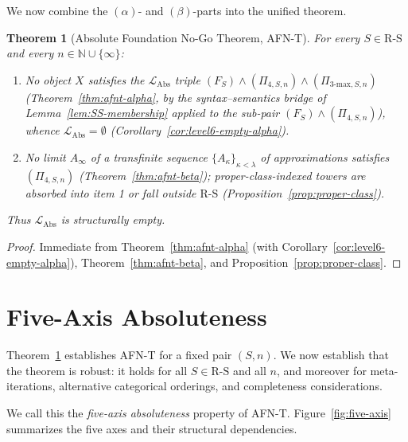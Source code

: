 \documentclass[11pt]{article}
\theoremstyle{plain}
\newtheorem{theorem}{Theorem}[section]
\theoremstyle{definition}
\newcommand{\RS}{\mathrm{R\text{-}S}}
\newcommand{\LAbs}{\mathcal{L}_{\mathrm{Abs}}}
\begin{document}
We now combine the $(\alpha)$- and $(\beta)$-parts into the unified theorem.

\begin{theorem}[Absolute Foundation No-Go Theorem, AFN-T]\label{thm:afnt}
For every $S \in \RS$ and every $n \in \mathbb{N} \cup \{\infty\}$:
\begin{enumerate}
\item No object $X$ satisfies the $\LAbs$ triple $(F_S) \wedge (\Pi_{4, S, n}) \wedge (\Pi_{3\text{-max}, S, n})$ (Theorem~\ref{thm:afnt-alpha}, by the syntax--semantics bridge of Lemma~\ref{lem:SS-membership} applied to the sub-pair $(F_S) \wedge (\Pi_{4, S, n})$), whence $\LAbs = \emptyset$ (Corollary~\ref{cor:level6-empty-alpha}).
\item No limit $A_\infty$ of a transfinite sequence $\{A_\kappa\}_{\kappa < \lambda}$ of approximations satisfies $(\Pi_{4, S, n})$ (Theorem~\ref{thm:afnt-beta}); proper-class-indexed towers are absorbed into item 1 or fall outside $\RS$ (Proposition~\ref{prop:proper-class}).
\end{enumerate}
Thus $\LAbs$ is structurally empty.
\end{theorem}

\begin{proof}
Immediate from Theorem~\ref{thm:afnt-alpha} (with Corollary~\ref{cor:level6-empty-alpha}), Theorem~\ref{thm:afnt-beta}, and Proposition~\ref{prop:proper-class}.
\end{proof}

\section{Five-Axis Absoluteness}\label{sec:five-axis}

Theorem~\ref{thm:afnt} establishes AFN-T for a fixed pair $(S, n)$. We now establish that the theorem is robust: it holds for all $S \in \RS$ and all $n$, and moreover for meta-iterations, alternative categorical orderings, and completeness considerations.

We call this the \emph{five-axis absoluteness} property of AFN-T. Figure~\ref{fig:five-axis} summarizes the five axes and their structural dependencies.
\end{document}
